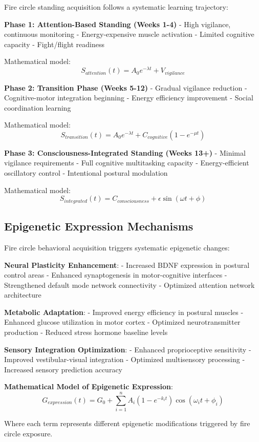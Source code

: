 \documentclass[12pt]{article}
\begin{document}
Fire circle standing acquisition follows a systematic learning trajectory:

\textbf{Phase 1: Attention-Based Standing (Weeks 1-4)}
- High vigilance, continuous monitoring
- Energy-expensive muscle activation
- Limited cognitive capacity
- Fight/flight readiness

Mathematical model:
$$S_{attention}(t) = A_0 e^{-\lambda t} + V_{vigilance}$$

\textbf{Phase 2: Transition Phase (Weeks 5-12)}
- Gradual vigilance reduction
- Cognitive-motor integration beginning
- Energy efficiency improvement
- Social coordination learning

Mathematical model:
$$S_{transition}(t) = A_0 e^{-\lambda t} + C_{cognitive} (1 - e^{-\mu t})$$

\textbf{Phase 3: Consciousness-Integrated Standing (Weeks 13+)}
- Minimal vigilance requirements
- Full cognitive multitasking capacity
- Energy-efficient oscillatory control
- Intentional postural modulation

Mathematical model:
$$S_{integrated}(t) = C_{consciousness} + \epsilon \sin(\omega t + \phi)$$

\subsection{Epigenetic Expression Mechanisms}

Fire circle behavioral acquisition triggers systematic epigenetic changes:

\textbf{Neural Plasticity Enhancement}:
- Increased BDNF expression in postural control areas
- Enhanced synaptogenesis in motor-cognitive interfaces
- Strengthened default mode network connectivity
- Optimized attention network architecture

\textbf{Metabolic Adaptation}:
- Improved energy efficiency in postural muscles
- Enhanced glucose utilization in motor cortex
- Optimized neurotransmitter production
- Reduced stress hormone baseline levels

\textbf{Sensory Integration Optimization}:
- Enhanced proprioceptive sensitivity
- Improved vestibular-visual integration
- Optimized multisensory processing
- Increased sensory prediction accuracy

\textbf{Mathematical Model of Epigenetic Expression}:
$$G_{expression}(t) = G_0 + \sum_{i=1}^{n} A_i (1 - e^{-k_i t}) \cos(\omega_i t + \phi_i)$$

Where each term represents different epigenetic modifications triggered by fire circle exposure.
\end{document}
